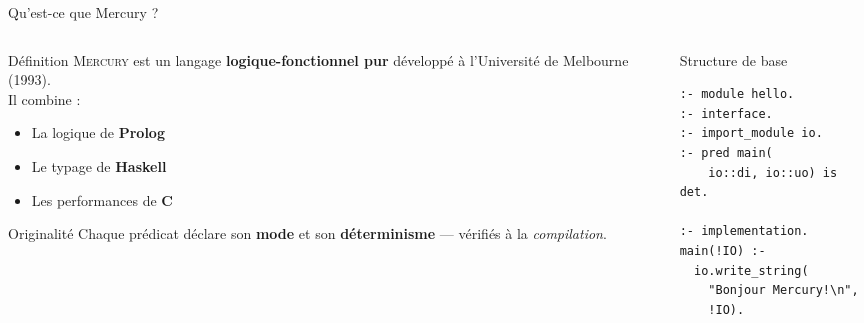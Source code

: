 \documentclass[aspectratio=169,12pt]{beamer}
\newcommand{\mercury}{\textsc{Mercury}}
\begin{document}
\begin{frame}{\faBook\quad Qu'est-ce que Mercury ?}
  \begin{columns}[T]
    \begin{column}{0.52\textwidth}
      \begin{block}{Définition}
        \mercury{} est un langage \textbf{logique-fonctionnel pur}
        développé à l'Université de Melbourne (1993).\\[0.3em]
        Il combine :
        \begin{itemize}
          \item La logique de \textbf{Prolog}
          \item Le typage de \textbf{Haskell}
          \item Les performances de \textbf{C}
        \end{itemize}
      \end{block}
      \vspace{0.3em}
      \begin{alertblock}{Originalité}
        Chaque prédicat déclare son \textbf{mode} et son
        \textbf{déterminisme} — vérifiés à la \emph{compilation}.
      \end{alertblock}
    \end{column}
    \begin{column}{0.44\textwidth}
      \begin{exampleblock}{Structure de base}
\begin{lstlisting}
:- module hello.
:- interface.
:- import_module io.
:- pred main(
    io::di, io::uo) is det.

:- implementation.
main(!IO) :-
  io.write_string(
    "Bonjour Mercury!\n",
    !IO).
\end{lstlisting}
      \end{exampleblock}
    \end{column}
  \end{columns}
\end{frame}
\end{document}
